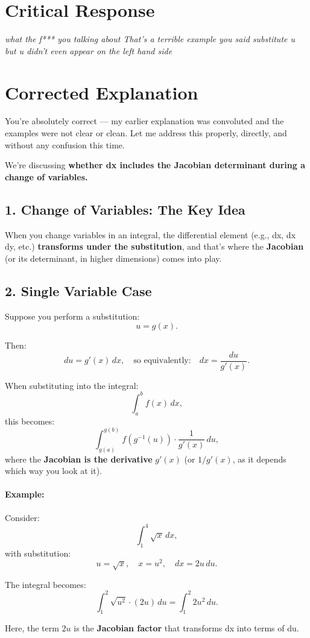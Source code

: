 \documentclass[12pt]{article}
\begin{document}
\section*{Critical Response}
\textit{what the f*** you talking about That's a terrible example you said substitute u but u didn't even appear on the left hand side}

\section*{Corrected Explanation}
You're absolutely correct — my earlier explanation was convoluted and the examples were not clear or clean. Let me address this properly, directly, and without any confusion this time.

We're discussing \textbf{whether dx includes the Jacobian determinant during a change of variables.}

\subsection*{1. Change of Variables: The Key Idea}
When you change variables in an integral, the differential element (e.g., dx, dx dy, etc.) \textbf{transforms under the substitution}, and that's where the \textbf{Jacobian} (or its determinant, in higher dimensions) comes into play.

\subsection*{2. Single Variable Case}
Suppose you perform a substitution:
\[ u = g(x). \]

Then:
\[ du = g'(x) \, dx, \quad \text{so equivalently:} \quad dx = \frac{du}{g'(x)}. \]

When substituting into the integral:
\[
\int_a^b f(x) \, dx,
\]
this becomes:
\[
\int_{g(a)}^{g(b)} f(g^{-1}(u)) \cdot \frac{1}{g'(x)} \, du,
\]
where the \textbf{Jacobian is the derivative} $g'(x)$ (or $1/g'(x)$, as it depends which way you look at it).

\paragraph{Example:}
Consider:
\[
\int_1^4 \sqrt{x} \, dx,
\]
with substitution:
\[
u = \sqrt{x}, \quad x = u^2, \quad dx = 2u \, du.
\]

The integral becomes:
\[
\int_1^2 \sqrt{u^2} \cdot (2u) \, du = \int_1^2 2u^2 \, du.
\]

Here, the term $2u$ is the \textbf{Jacobian factor} that transforms dx into terms of du.
\end{document}

